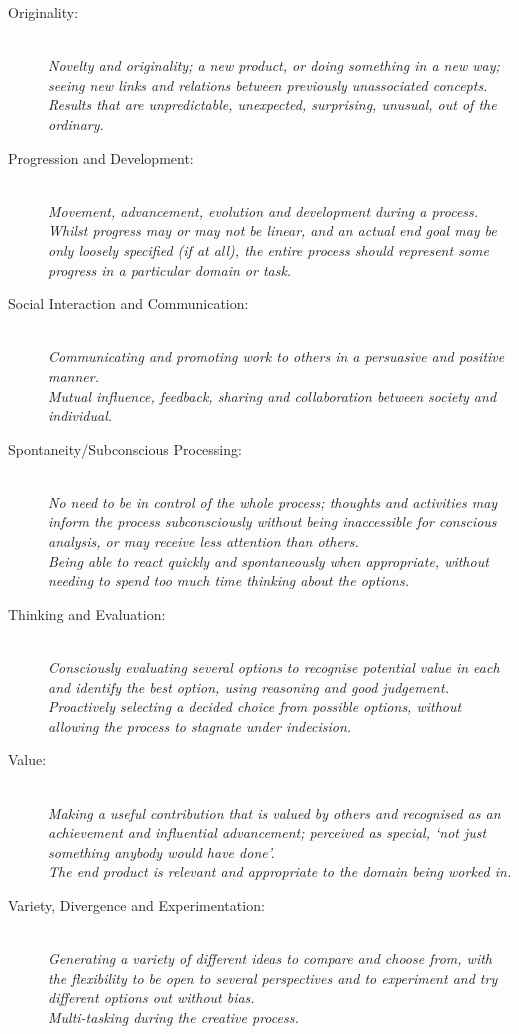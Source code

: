 \documentclass[10pt,letterpaper]{article}
\begin{document}
\begin{description}
\item[Originality:] \mbox{}\\{\em
Novelty and originality; a new product, or doing something in a new way; seeing new links and relations between previously unassociated concepts.\\
Results that are unpredictable, unexpected, surprising, unusual, out of the ordinary.
}

\item[Progression and Development:] \mbox{}\\{\em
Movement, advancement, evolution and development during a process.\\
Whilst progress may or may not be linear, and an actual end goal may be only loosely specified (if at all), the entire process should represent some progress in a particular domain or task. }

\item[Social Interaction and Communication:] \mbox{}\\{\em
Communicating and promoting work to others in a persuasive and positive manner.\\
Mutual influence, feedback, sharing and collaboration between society and individual.
}

\item[Spontaneity/Subconscious Processing:] \mbox{}\\{\em 
No need to be in control of the whole process; thoughts and activities may inform the process subconsciously without being inaccessible for conscious analysis, or may receive less attention than others. \\
Being able to react quickly and spontaneously when appropriate, without needing to spend too much time thinking about the options.
}

\item[Thinking and Evaluation:] \mbox{}\\{\em 
Consciously evaluating several options to recognise potential value in each and identify the best option, using reasoning and good judgement.\\
Proactively selecting a decided choice from possible options, without allowing the process to stagnate under indecision.
}

\item[Value:] \mbox{}\\{\em 
Making a useful contribution that is valued by others and recognised as an achievement and influential advancement; perceived as special, `not just something anybody would have done'.\\
The end product is relevant and appropriate to the domain being worked in.
}

\item[Variety, Divergence and Experimentation:] \mbox{}\\{\em 
Generating a variety of different ideas to compare and choose from, with the flexibility to be open to several perspectives and to experiment and try different options out without bias.\\
Multi-tasking during the creative process.
}
\end{description}
\end{document}
